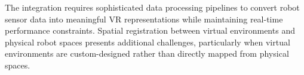 The integration requires sophisticated data processing pipelines to convert robot sensor data into meaningful VR representations while maintaining real-time performance constraints. Spatial registration between virtual environments and physical robot spaces presents additional challenges, particularly when virtual environments are custom-designed rather than directly mapped from physical spaces.



